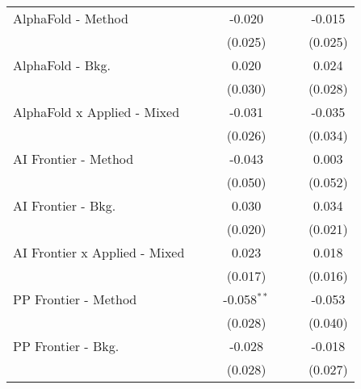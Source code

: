 \begin{tabular}{lcccccc}
   AlphaFold - Method             &             &               & -0.020         &               &               & -0.015\\   
                                  &             &               & (0.025)        &               &               & (0.025)\\   
   AlphaFold - Bkg.               &             &               & 0.020          &               &               & 0.024\\   
                                  &             &               & (0.030)        &               &               & (0.028)\\   
   AlphaFold x Applied - Mixed    &             &               & -0.031         &               &               & -0.035\\   
                                  &             &               & (0.026)        &               &               & (0.034)\\   
   AI Frontier - Method           &             &               & -0.043         &               &               & 0.003\\   
                                  &             &               & (0.050)        &               &               & (0.052)\\   
   AI Frontier - Bkg.             &             &               & 0.030          &               &               & 0.034\\   
                                  &             &               & (0.020)        &               &               & (0.021)\\   
   AI Frontier x Applied - Mixed  &             &               & 0.023          &               &               & 0.018\\   
                                  &             &               & (0.017)        &               &               & (0.016)\\   
   PP Frontier - Method           &             &               & -0.058$^{**}$  &               &               & -0.053\\   
                                  &             &               & (0.028)        &               &               & (0.040)\\   
   PP Frontier - Bkg.             &             &               & -0.028         &               &               & -0.018\\   
                                  &             &               & (0.028)        &               &               & (0.027)\\   

\end{tabular}
